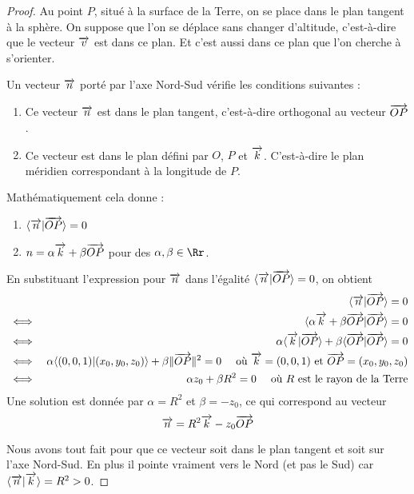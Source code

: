\documentclass[class=report,crop=false]{standalone}
\begin{document}
\begin{proof}
Au point $P$, situé à la surface de la Terre, on se place dans le plan tangent 
à la sphère. On suppose %
que l'on se déplace sans changer d'altitude,
c'est-à-dire que le vecteur $\overrightarrow v$ est dans ce plan.
Et c'est aussi dans ce plan que l'on cherche à s'orienter.



Un vecteur $\overrightarrow n$ porté par l'axe Nord-Sud vérifie les conditions suivantes :
\begin{enumerate}
  \item Ce vecteur $\overrightarrow n$ est dans le plan tangent, 
  c'est-à-dire orthogonal au vecteur $\overrightarrow{OP}$.
  
  \item Ce vecteur est dans le plan défini par $O$, $P$ et $\overrightarrow k$.
  C'est-à-dire le plan méridien correspondant à la longitude de $P$.
\end{enumerate}

Mathématiquement cela donne :
\begin{enumerate}
  \item $\langle \overrightarrow n | \overrightarrow{OP} \rangle = 0$
  \item $n = \alpha \overrightarrow k + \beta\overrightarrow{OP}  $ pour des $\alpha,\beta \in \Rr$.
\end{enumerate}


En substituant l'expression pour $\overrightarrow n$ dans l'égalité $\langle \overrightarrow n | \overrightarrow{OP} \rangle = 0$,
on obtient
\begin{eqnarray*}
&&          \langle \overrightarrow n | \overrightarrow{OP} \rangle = 0   \\
&\iff& \langle \alpha \overrightarrow k + \beta\overrightarrow{OP} | \overrightarrow{OP} \rangle = 0 \\
&\iff&  \alpha \langle \overrightarrow k | \overrightarrow{OP} \rangle
+ \beta \langle \overrightarrow{OP} | \overrightarrow{OP} \rangle = 0 \\
&\iff&  \alpha\langle (0,0,1) | (x_0,y_0,z_0) \rangle  + \beta \|\overrightarrow{OP} \|^2 = 0 
\quad \text{ où } \overrightarrow k = (0,0,1) \text{ et } \overrightarrow{OP} = (x_0,y_0,z_0)\\
&\iff&  \alpha z_0 + \beta R^2  = 0 
\quad \text{ où } R \text{ est le rayon de la Terre} \\
\end{eqnarray*}
Une solution est donnée par $\alpha = R^2$ et $\beta = -z_0$, ce qui correspond au vecteur
$$\overrightarrow n = R^2 \overrightarrow{k} - z_0 \overrightarrow{OP}$$

Nous avons tout fait pour que ce vecteur soit dans le plan tangent et soit sur l'axe Nord-Sud.
En plus il pointe vraiment vers le Nord (et pas le Sud) car
$\langle \overrightarrow n | \overrightarrow k \rangle = R^2 > 0$.
\end{proof}
\end{document}

